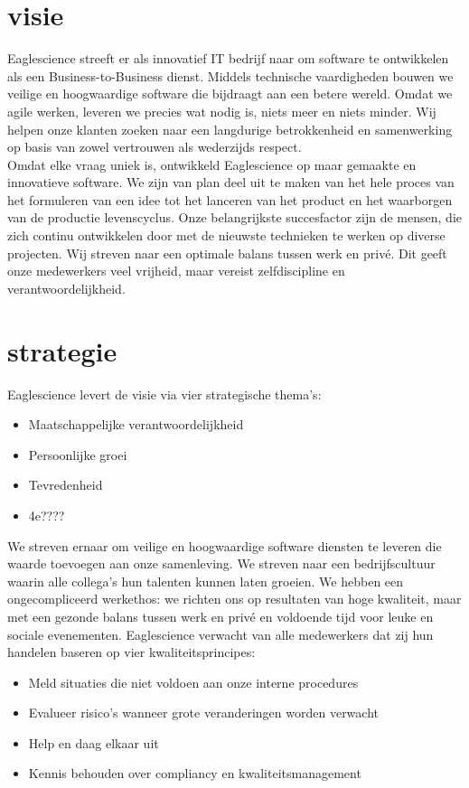 \section{visie}
Eaglescience streeft er als innovatief IT bedrijf naar om software te ontwikkelen als een Business-to-Business dienst. Middels technische vaardigheden bouwen we veilige en hoogwaardige software die bijdraagt aan een betere wereld. Omdat we agile werken, leveren we precies wat nodig is, niets meer en niets minder. Wij helpen onze klanten zoeken naar een langdurige betrokkenheid en samenwerking op basis van zowel vertrouwen als wederzijds respect. \\
Omdat elke vraag uniek is, ontwikkeld Eaglescience op maar gemaakte en innovatieve software. We zijn van plan deel uit te maken van het hele proces van het formuleren van een idee tot het lanceren van het product en het waarborgen van de productie levenscyclus. Onze belangrijkste succesfactor zijn de mensen, die zich continu ontwikkelen door met de nieuwste technieken te werken op diverse projecten. Wij streven naar een optimale balans tussen werk en priv\'e. Dit geeft onze medewerkers veel vrijheid, maar vereist zelfdiscipline en verantwoordelijkheid.

\section{strategie}
Eaglescience levert de visie via vier strategische thema's:
\begin{itemize}
\item Maatschappelijke verantwoordelijkheid
\item Persoonlijke groei
\item Tevredenheid
\item 4e???? %
\end{itemize}
We streven ernaar om veilige en hoogwaardige software diensten te leveren die waarde toevoegen aan onze samenleving. We streven naar een bedrijfscultuur waarin alle collega's hun talenten kunnen laten groeien. We hebben een ongecompliceerd werkethos: we richten ons op resultaten van hoge kwaliteit, maar met een gezonde balans tussen werk en priv\'e en voldoende tijd voor leuke en sociale evenementen. Eaglescience verwacht van alle medewerkers dat zij hun handelen baseren op vier kwaliteitsprincipes:
\begin{itemize}
\item Meld situaties die niet voldoen aan onze interne procedures
\item Evalueer risico's wanneer grote veranderingen worden verwacht
\item Help en daag elkaar uit
\item Kennis behouden over compliancy en kwaliteitsmanagement
\end{itemize}

